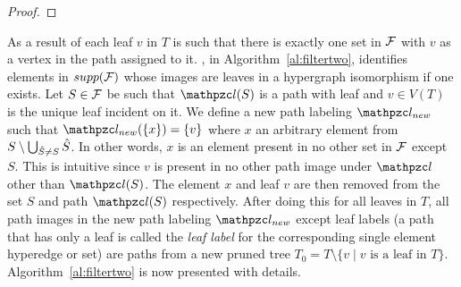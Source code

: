 \begin{proof}
\end{proof}

As a result of \filteri each leaf $v$ in $T$ is such that there
is exactly one set in ${\cal F}$ with $v$ as a vertex in the path assigned
to it.  \filterii, in Algorithm~\ref{al:filtertwo}, identifies
elements in $supp({\cal F})$ whose images are leaves in a hypergraph
isomorphism if one exists.  Let $S \in {\cal F}$ be such that $\cl(S)$ is a
path with leaf and $v \in V(T)$ is the unique leaf incident on it.  We
define a new path labeling $\cl_{new}$ such that $\cl_{new}(\set{x}) =
\set{v}$ where $x$ an arbitrary element from $S \setminus \bigcup_{{\hat S}
  \ne S} {\hat S}$. In other words, $x$ is an element present in no other
set in ${\cal F}$ except $S$. This is intuitive since $v$ is present in no
other path image under $\cl$ other than $\cl(S)$.  The element $x$ and
leaf $v$ are then removed from the set $S$ and path $\cl(S)$
respectively. After doing this for all leaves in $T$, all path images
in the new path labeling $\cl_{new}$ except leaf labels (a path that
has only a leaf is called the {\em leaf label} for the corresponding
single element hyperedge or set) are paths from a new pruned tree $T_0
= T \setminus \{v \mid v \text{ is a leaf in }
T\}$. Algorithm~\ref{al:filtertwo} is now presented with details.


